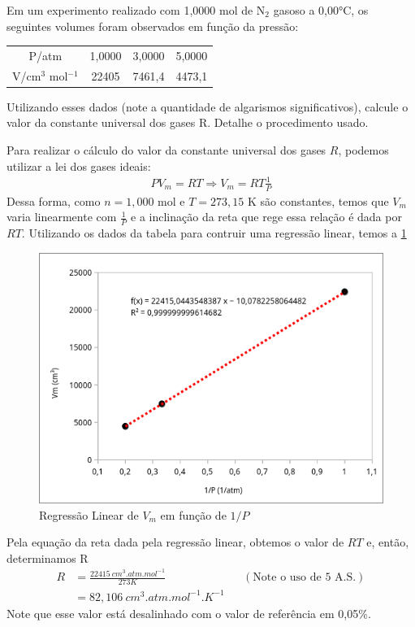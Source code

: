 \begin{xcs}
    Em um experimento realizado com 1,0000 mol de N\(_2\) gasoso a 0,00°C, os
    seguintes volumes foram observados em função da pressão: 
    \begin{center}
    \begin{tabular}{c | c c c}
    \hline
        P/atm & 1,0000 & 3,0000 & 5,0000\\
        V/cm\(^3\) mol\(^{-1}\) & 22405 & 7461,4 & 4473,1\\
    \hline
    \end{tabular}
    \end{center}
    Utilizando esses dados (note a quantidade de algarismos significativos),
    calcule o valor da constante universal dos gases R. Detalhe o procedimento
    usado.
\end{xcs}
\begin{rsl}
    
    Para realizar o cálculo do valor da constante universal dos gases \( R \),
    podemos utilizar a lei dos gases ideais: 
    \begin{align*}
        PV_m = RT \Rightarrow 
        V_m = RT \frac{1}{P} 
    \end{align*}
    Dessa forma, como \( n = 1,000 \) mol e \( T = 273,15 \) K são constantes,
    temos que \( V_m \) varia linearmente com \( \frac{1}{P} \) e a inclinação
    da reta que rege essa relação é dada por \( RT \). Utilizando os dados
    da tabela para contruir uma regressão linear, temos a \cref{reggeo} 
    \begin{figure}[H]
        \centering
        \includegraphics[width=.4\linewidth]{images/geo1.png}
        \caption{Regressão Linear de \(V_m\) em função de \( 1/P \) }
        \label{reggeo}
    \end{figure}
    Pela equação da reta dada pela regressão linear, obtemos o valor de \( RT \)
    e, então, determinamos R
    \begin{align*}
        R &= \frac{22415 \ \unit{cm^3.atm.mol^{-1}} }{273K} && (\text{Note o uso
        de 5 A.S.})\\
        &= 82,106 \ \unit{cm^3.atm.mol^{-1}.K^{-1}}
    \end{align*}
    Note que esse valor está desalinhado com o valor de referência em 0,05\%.
    
\end{rsl}
